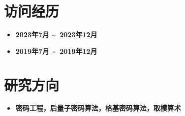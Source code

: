 \documentclass[UTF8,AutoFakeBold]{resume}
\begin{document}
\section{\hspace{0.25em}\makebox[0.75em][c]{\faGraduationCap} 
\fangsong\textbf{访问经历}}
\begin{itemize}
\item {}
{\textbf{2023年7月 \textasciitilde \ 2023年12月}}
\item {}
{\textbf{2019年7月 \textasciitilde \ 2019年12月}}
\end{itemize}
\section{\hspace{0.25em}\makebox[0.75em][c]{\faPuzzlePiece} \fangsong\textbf{研究方向}}
\begin{itemize}
\item \textbf{密码工程，后量子密码算法，格基密码算法，取模算术}
\end{itemize}
\vspace{2mm}
\end{document}
